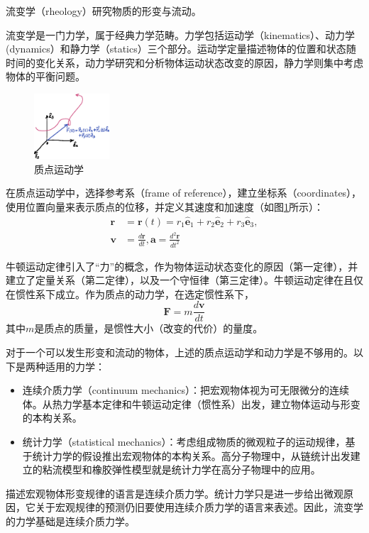 \documentclass[main.tex]{subfiles}
\begin{document}
流变学（rheology）研究物质的形变与流动。

流变学是一门力学，属于经典力学范畴。力学包括运动学（kinematics）、动力学(dynamics）和静力学（statics）三个部分。运动学定量描述物体的位置和状态随时间的变化关系，动力学研究和分析物体运动状态改变的原因，静力学则集中考虑物体的平衡问题。\cite[p.~1]{邓文基2009大物上}

\begin{figure}
\centering
\includegraphics[width=0.25\textwidth]{images/I.1.1.eps}
\caption{质点运动学}
\label{fig:I.1.1}
\end{figure}

在质点运动学中，选择参考系（frame of reference），建立坐标系（coordinates），使用位置向量来表示质点的位移，并定义其速度和加速度\cite[附录A,p.~422]{邓文基2009大物上}（如图\ref{fig:I.1.1}所示）：
\begin{align*}
\mathbf{r}&=\mathbf{r}\left(t\right)=r_1\mathbf{\hat{e}}_1+r_2\mathbf{\hat{e}}_2+r_3\mathbf{\hat{e}}_3,\\
\mathbf{v}&=\frac{d\mathbf{r}}{dt},\mathbf{a}=\frac{d^2\mathbf{r}}{dt^2}
\end{align*}

牛顿运动定律引入了“力”的概念，作为物体运动状态变化的原因（第一定律），并建立了定量关系（第二定律），以及一个守恒律（第三定律）。牛顿运动定律在且仅在惯性系下成立。作为质点的动力学，在选定惯性系下，
\[\mathbf{F}=m\frac{d\mathbf{v}}{dt}\]
其中$m$是质点的质量，是惯性大小（改变的代价）的量度。

对于一个可以发生形变和流动的物体，上述的质点运动学和动力学是不够用的。以下是两种适用的力学：
\begin{itemize}
    \item 连续介质力学（continuum mechanics）：把宏观物体视为可无限微分的连续体。从热力学基本定律和牛顿运动定律（惯性系）出发，建立物体运动与形变的本构关系。
    \item 统计力学（statistical mechanics）：考虑组成物质的微观粒子的运动规律，基于统计力学的假设推出宏观物体的本构关系。高分子物理中，从链统计出发建立的粘流模型和橡胶弹性模型就是统计力学在高分子物理中的应用。
\end{itemize}

描述宏观物体形变规律的语言是连续介质力学。统计力学只是进一步给出微观原因，它关于宏观规律的预测仍旧要使用连续介质力学的语言来表述。因此，流变学的力学基础是连续介质力学。
\end{document}
